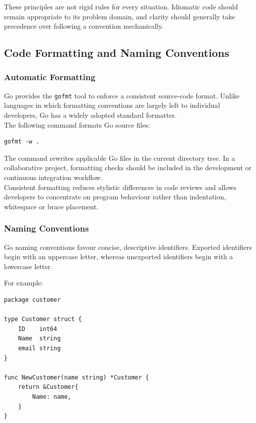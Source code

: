 These principles are not rigid rules for every situation. Idiomatic code should remain appropriate to its problem domain, and clarity should generally take precedence over following a convention mechanically.

\subsection{Code Formatting and Naming Conventions}

\subsubsection{Automatic Formatting}

Go provides the \texttt{gofmt} tool to enforce a consistent source-code format. Unlike languages in which formatting conventions are largely left to individual developers, Go has a widely adopted standard formatter.\\

The following command formats Go source files:

\begin{lstlisting}
gofmt -w .
\end{lstlisting}

The command rewrites applicable Go files in the current directory tree. In a collaborative project, formatting checks should be included in the development or continuous integration workflow.\\

Consistent formatting reduces stylistic differences in code reviews and allows developers to concentrate on program behaviour rather than indentation, whitespace or brace placement.

\subsubsection{Naming Conventions}

Go naming conventions favour concise, descriptive identifiers. Exported identifiers begin with an uppercase letter, whereas unexported identifiers begin with a lowercase letter.

For example:

\begin{lstlisting}
package customer

type Customer struct {
    ID    int64
    Name  string
    email string
}

func NewCustomer(name string) *Customer {
    return &Customer{
        Name: name,
    }
}
\end{lstlisting}

